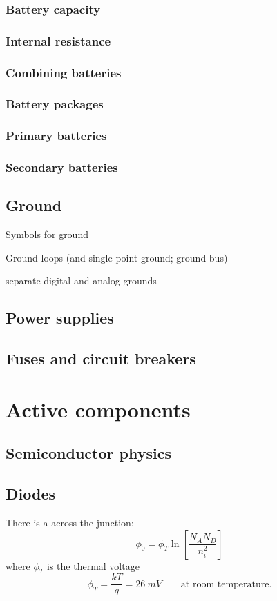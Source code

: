 \documentclass{report}
\begin{document}
\subsection{Battery capacity}
\subsection{Internal resistance}
\subsection{Combining batteries}
\subsection{Battery packages}
\subsection{Primary batteries}
\subsection{Secondary batteries}

\section{Ground}
Symbols for ground

Ground loops (and single-point ground; ground bus)

separate digital and analog grounds
\section{Power supplies}
\section{Fuses and circuit breakers}

\chapter{Active components}
\section{Semiconductor physics}
\section{Diodes}
There is a  across the junction:
\[ \phi_0 = \phi_T \ln \left[\frac{N_AN_D}{n_i^2}\right] \]
where $\phi_T$ is the thermal voltage
\[ \phi_T = \frac{kT}{q} = \SI{26}{mV} \qquad \text{at room temperature.} \]
\end{document}

